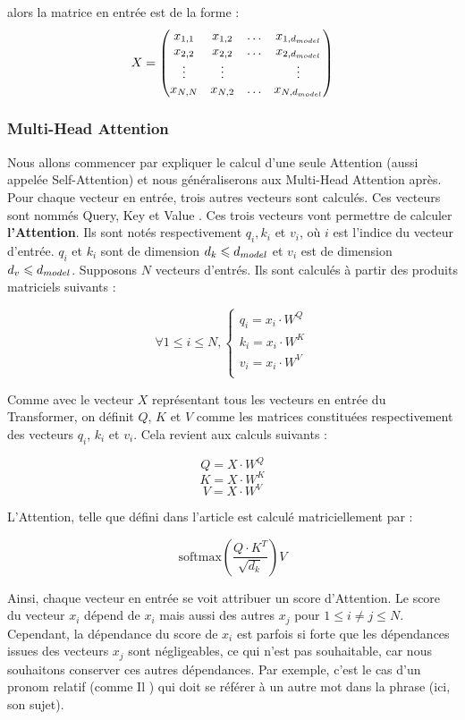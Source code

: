 alors la matrice en entrée est de la forme :
\[ X = 
\begin{pmatrix}
  x_{1,1} & x_{1,2} & \ldots & x_{1,d_{model}} \\
  x_{2,2} & x_{2,2} & \ldots & x_{2,d_{model}} \\
  \vdots  & \vdots  &        & \vdots \\
  x_{N,N} & x_{N,2} & \ldots & x_{N,d_{model}}
\end{pmatrix}
\]

\subsubsection{Multi-Head Attention}

Nous allons commencer par expliquer le calcul d'une seule Attention (aussi appelée Self-Attention) et nous généraliserons aux Multi-Head Attention après. \\

Pour chaque vecteur en entrée, trois autres vecteurs sont calculés. Ces vecteurs sont nommés \og Query, Key et Value \fg{}.
Ces trois vecteurs vont permettre de calculer \textbf{l'Attention}.
Ils sont notés respectivement $q_i, k_i$ et $v_i$, où $i$ est l'indice du vecteur d'entrée. $q_i$ et $k_i$ sont de dimension
$d_k \leqslant d_{model}$ et $v_i$ est de dimension $d_v \leqslant d_{model}$.
Supposons $N$ vecteurs d'entrés. Ils sont calculés à partir des produits matriciels suivants :

\[ \forall 1 \leq i \leq N,
  \begin{cases}
  q_i = x_i \cdot W^Q \\
  k_i = x_i \cdot W^K \\
  v_i = x_i \cdot W^V \\
  \end{cases}  \]

Comme avec le vecteur $X$ représentant tous les vecteurs en entrée du Transformer, 
on définit $Q$, $K$ et $V$ comme les matrices constituées respectivement des vecteurs $q_i$, $k_i$ et $v_i$.
Cela revient aux calculs suivants :

\[ Q = X \cdot W^Q  \]
\[ K = X \cdot W^K  \]
\[ V = X \cdot W^V  \]

L'Attention, telle que défini dans l'article \cite{vaswani2017attention} est calculé matriciellement par :

\[ \text{softmax}\left( \frac{Q \cdot K^T}{\sqrt{d_k}} \right) V \]

Ainsi, chaque vecteur en entrée se voit attribuer un \og score \fg{} d'Attention. Le score du vecteur $x_i$ dépend de $x_i$ mais 
aussi des autres $x_j$ pour $1 \leq i \neq j \leq N$. Cependant, la dépendance du score de $x_i$ est parfois si forte que les
dépendances issues des vecteurs $x_j$ sont négligeables, ce qui n'est pas souhaitable, car nous souhaitons
conserver ces autres dépendances. Par exemple, c'est le cas d'un pronom relatif (comme \og Il \fg{}) qui doit se référer 
à un autre mot dans la phrase (ici, son sujet). \\


